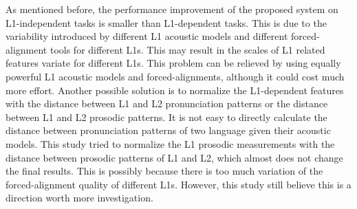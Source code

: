 As mentioned before, the performance improvement of the proposed system on L1-independent tasks is smaller than L1-dependent tasks. This is due to the variability introduced by different L1 acoustic models and different forced-alignment tools for different L1s. This may result in the scales of L1 related features variate for different L1s. This problem can be relieved by using equally powerful L1 acoustic models and forced-alignments, although it could cost much more effort. Another possible solution is to normalize the L1-dependent features with the distance between L1 and L2 pronunciation patterns or the distance between L1 and L2 prosodic patterns. It is not easy to directly calculate the distance between pronunciation patterns of two language given their acoustic models. This study tried to normalize the L1 prosodic measurements with the distance between prosodic patterns of L1 and L2, which almost does not change the final results. This is possibly because there is too much variation of the forced-alignment quality of different L1s. However, this study still believe this is a direction worth more investigation.
